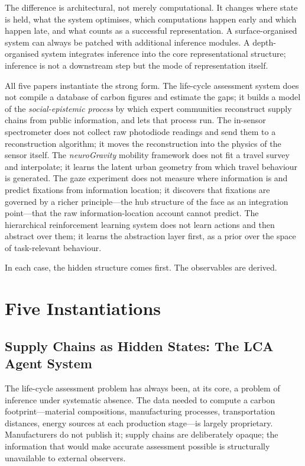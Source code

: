 \documentclass[12pt, letterpaper]{article}
\theoremstyle{remark}
\newcommand{\neuro}{\textit{neuroGravity}}
\begin{document}
The difference is architectural, not merely computational.  It changes
where state is held, what the system optimises, which computations happen
early and which happen late, and what counts as a successful representation.
A surface-organised system can always be patched with additional inference
modules.  A depth-organised system integrates inference into the core
representational structure; inference is not a downstream step but the
mode of representation itself.

All five papers instantiate the strong form.  The life-cycle assessment
system does not compile a database of carbon figures and estimate the
gaps; it builds a model of the \emph{social-epistemic process} by which
expert communities reconstruct supply chains from public information, and
lets that process run.  The in-sensor spectrometer does not collect raw
photodiode readings and send them to a reconstruction algorithm; it moves
the reconstruction into the physics of the sensor itself.  The \neuro{}
mobility framework does not fit a travel survey and interpolate; it learns
the latent urban geometry from which travel behaviour is generated.  The
gaze experiment does not measure where information is and predict fixations
from information location; it discovers that fixations are governed by a
richer principle---the hub structure of the face as an integration
point---that the raw information-location account cannot predict.  The
hierarchical reinforcement learning system does not learn actions and then
abstract over them; it learns the abstraction layer first, as a prior over
the space of task-relevant behaviour.

In each case, the hidden structure comes first.  The observables are derived.

\section{Five Instantiations}

\subsection{Supply Chains as Hidden States: The LCA Agent System}

The life-cycle assessment problem has always been, at its core, a problem
of inference under systematic absence.  The data needed to compute a carbon
footprint---material compositions, manufacturing processes, transportation
distances, energy sources at each production stage---is largely proprietary.
Manufacturers do not publish it; supply chains are deliberately opaque;
the information that would make accurate assessment possible is structurally
unavailable to external observers.
\end{document}
